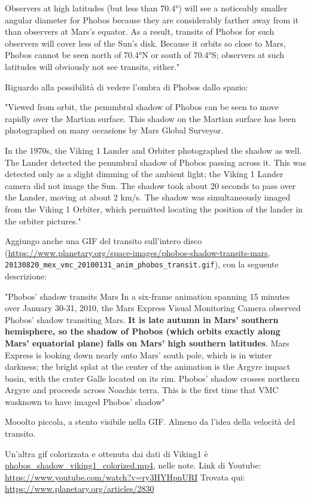 \documentclass[a4paper,10pt,openany,oneside]{memoir}
\begin{document}
Observers at high latitudes (but less than 70.4°) will see a noticeably smaller angular diameter for Phobos because they are considerably farther away from it than observers at Mars's equator. As a result, transits of Phobos for such observers will cover less of the Sun's disk. Because it orbits so close to Mars, Phobos cannot be seen north of 70.4°N or south of 70.4°S; observers at such latitudes will obviously not see transits, either."

Riguardo alla possibilità di vedere l'ombra di Phobos dallo spazio: 

"Viewed from orbit, the penumbral shadow of Phobos can be seen to move rapidly over the Martian surface. This shadow on the Martian surface has been photographed on many occasions by Mars Global Surveyor. 

In the 1970s, the Viking 1 Lander and Orbiter photographed the shadow as well. The Lander detected the penumbral shadow of Phobos passing across it. This was detected only as a slight dimming of the ambient light; the Viking 1 Lander camera did not image the Sun. The shadow took about 20 seconds to pass over the Lander, moving at about 2 km/s. The shadow was simultaneously imaged from the Viking 1 Orbiter, which permitted locating the position of the lander in the orbiter pictures."

Aggiungo anche una GIF del transito sull'intero disco (\url{https://www.planetary.org/space-images/phobos-shadow-transits-mars}, \texttt{20130820\_mex\_vmc\_20100131\_anim\_phobos\_transit.gif}), con la seguente descrizione: 

"Phobos' shadow transits Mars In a six-frame animation spanning 15 minutes over January 30-31, 2010, the Mars Express Visual Monitoring Camera observed Phobos' shadow transiting Mars. \textbf{It is late autumn in Mars' southern hemisphere, so the shadow of Phobos (which orbits exactly along Mars' equatorial plane) falls on Mars' high southern latitudes}. Mars Express is looking down nearly onto Mars' south pole, which is in winter darkness; the bright splat at the center of the animation is the Argyre impact basin, with the crater Galle located on its rim. Phobos' shadow crosses northern Argyre and proceeds across Noachis terra. This is the first time that VMC wasknown to have imaged Phobos' shadow"

Mooolto piccola, a stento visibile nella GIF. Almeno da l'idea della velocità del transito.

Un'altra gif colorizzata e ottenuta dai dati di Viking1 è \url{phobos_shadow_viking1_colorized.mp4}, nelle note. Link di Youtube: \url{https://www.youtube.com/watch?v=ry3HYHpnURI} Trovata qui: \url{https://www.planetary.org/articles/2830} 
\end{document}
